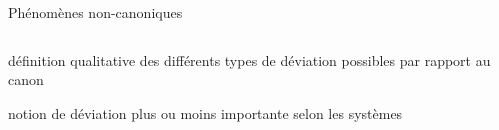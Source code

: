 \begin{frame}
\end{frame}





\begin{frame}[t]{Phénomènes non-canoniques}
     \begin{columns}[t] %
     \begin{column}[T]{5cm} %
\vspace*{-.5cm}
\begin{wideitemize}
\item {}

\begin{smallwideitemize}\scriptsize
\item[\highlightii{+}] définition qualitative des différents types de déviation
  possibles par rapport au canon
\item[\highlightii{+}] notion de déviation plus ou moins importante selon les systèmes






\end{smallwideitemize}
\end{wideitemize}
\end{column}
\end{columns}
\end{frame}
